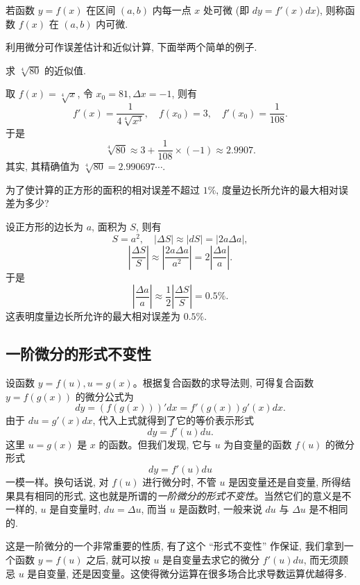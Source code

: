 若函数 $y=f(x)$ 在区间 $(a,b)$ 内每一点 $x$ 处可微 (即 $dy=f'(x)dx$), 则称函数 $f(x)$ 在 $(a,b)$ 内可微.

利用微分可作误差估计和近似计算, 下面举两个简单的例子.

\begin{example}\label{example:ma-4-3-1}
求 $\sqrt[4]{80}$ 的近似值.
\end{example}


\begin{solve}
取 $f(x)=\sqrt[4]{x}$, 令 $x_0=81,\Delta x=-1$, 则有
\[
  f'(x)=\frac{1}{4\sqrt[4]{x^3}},
  \quad
  f(x_0)=3,
  \quad
  f'(x_0)=\frac{1}{108}.
\]
于是
\[
  \sqrt[4]{80}\approx 3+\frac{1}{108}\times(-1)\approx2.9907.
\]
其实, 其精确值为 $\sqrt[4]{80}=2.990697\cdots$.
\end{solve}


\begin{example}\label{example:ma-4-3-2}
为了使计算的正方形的面积的相对误差不超过 $1\%$, 度量边长所允许的最大相对误差为多少?
\end{example}


\begin{solve}
设正方形的边长为 $a$, 面积为 $S$, 则有
\[
  S=a^2,\quad |\Delta S|\approx |dS|=|2a\Delta a|,
\]
\[
  \left|\frac{\Delta S}{S}\right|
  \approx
  \left|\frac{2a\Delta a}{a^2}\right|
  =
  2\left|\frac{\Delta a}{a}\right|.
\]
于是
\[
  \left|\frac{\Delta a}{a}\right|
  \approx
  \frac{1}{2}\left|\frac{\Delta S}{S}\right|
  =
  0.5\%.
\]
这表明度量边长所允许的最大相对误差为 $0.5\%$.
\end{solve}


\subsection{一阶微分的形式不变性}
\label{subsec:ma-4-3-2}

设函数 $y=f(u),u=g(x)$。根据复合函数的求导法则, 可得复合函数 $y=f(g(x))$ 的微分公式为
\[
  dy=(f(g(x)))'dx=f'(g(x))g'(x)dx.
\]
由于 $du=g'(x)dx$, 代入上式就得到了它的等价表示形式
\[
  dy=f'(u)du.
\]
这里 $u=g(x)$ 是 $x$ 的函数。但我们发现, 它与 $u$ 为自变量的函数 $f(u)$ 的微分形式
\[
  dy=f'(u)du
\]
一模一样。换句话说, 对 $f(u)$ 进行微分时, 不管 $u$ 是因变量还是自变量, 所得结果具有相同的形式, 这也就是所谓的\emph{一阶微分的形式不变性}。当然它们的意义是不一样的, $u$ 是自变量时, $du=\Delta u$, 而当 $u$ 是函数时, 一般来说 $du$ 与 $\Delta u$ 是不相同的.

这是一阶微分的一个非常重要的性质, 有了这个 ``形式不变性'' 作保证, 我们拿到一个函数 $y=f(u)$ 之后, 就可以按 $u$ 是自变量去求它的微分 $f'(u)du$, 而无须顾忌 $u$ 是自变量, 还是因变量。这使得微分运算在很多场合比求导数运算优越得多.

